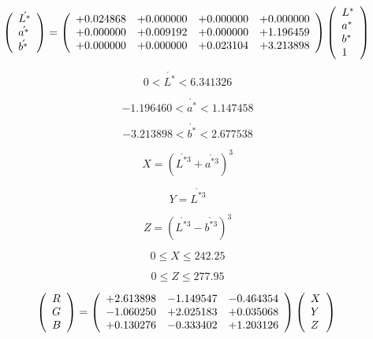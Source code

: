 \documentclass{article}
\begin{document}
\[ \left( \begin{array}{l} \acute{L^{*}} \\ \acute{a^{*}} \\ \acute{b^{*}} \\ \end{array} \right) = \left( \begin{array}{llll} +0.024868 & +0.000000 & +0.000000 & +0.000000 \\ +0.000000 & +0.009192 & +0.000000 & +1.196459 \\ +0.000000 & +0.000000 & +0.023104 & +3.213898 \\ \end{array} \right) \left( \begin{array}{l} L^{*} \\ a^{*} \\ b^{*} \\ 1 \\ \end{array} \right) \\ \]
\pagebreak

\[ 0 < \acute{L^{*}} < 6.341326 \]
\pagebreak

\[ -1.196460 < \acute{a^{*}} < 1.147458 \]
\pagebreak

\[ -3.213898 < \acute{b^{*}} < 2.677538 \]
\pagebreak

\[ X = \left(\acute{L^{*3}} + \acute{a^{*3}}\right)^{3} \]
\pagebreak

\[ Y = \acute{L^{*3}} \]
\pagebreak

\[ Z = \left(\acute{L^{*3}} - \acute{b^{*3}}\right)^{3} \]
\pagebreak

\[ 0 \le X \le 242.25 \]
\pagebreak

\[ 0 \le Z \le 277.95 \]
\pagebreak

\[ \left( \begin{array}{l} R \\ G \\ B \\ \end{array} \right) = \left( \begin{array}{lll} +2.613898 & -1.149547 & -0.464354 \\ -1.060250 & +2.025183 & +0.035068 \\ +0.130276 & -0.333402 & +1.203126 \\ \end{array} \right) \left( \begin{array}{l} X \\ Y \\ Z \\ \end{array} \right) \\ \]
\pagebreak
\end{document}

